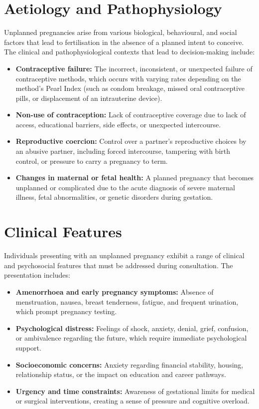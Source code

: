 \section*{Aetiology and Pathophysiology}
Unplanned pregnancies arise from various biological, behavioural, and social factors that lead to fertilisation in the absence of a planned intent to conceive. The clinical and pathophysiological contexts that lead to decision-making include:
\begin{itemize}
    \item \textbf{Contraceptive failure:} The incorrect, inconsistent, or unexpected failure of contraceptive methods, which occurs with varying rates depending on the method's Pearl Index (such as condom breakage, missed oral contraceptive pills, or displacement of an intrauterine device).
    \item \textbf{Non-use of contraception:} Lack of contraceptive coverage due to lack of access, educational barriers, side effects, or unexpected intercourse.
    \item \textbf{Reproductive coercion:} Control over a partner's reproductive choices by an abusive partner, including forced intercourse, tampering with birth control, or pressure to carry a pregnancy to term.
    \item \textbf{Changes in maternal or fetal health:} A planned pregnancy that becomes unplanned or complicated due to the acute diagnosis of severe maternal illness, fetal abnormalities, or genetic disorders during gestation.
\end{itemize}

\section*{Clinical Features}
Individuals presenting with an unplanned pregnancy exhibit a range of clinical and psychosocial features that must be addressed during consultation. The presentation includes:
\begin{itemize}
    \item \textbf{Amenorrhoea and early pregnancy symptoms:} Absence of menstruation, nausea, breast tenderness, fatigue, and frequent urination, which prompt pregnancy testing.
    \item \textbf{Psychological distress:} Feelings of shock, anxiety, denial, grief, confusion, or ambivalence regarding the future, which require immediate psychological support.
    \item \textbf{Socioeconomic concerns:} Anxiety regarding financial stability, housing, relationship status, or the impact on education and career pathways.
    \item \textbf{Urgency and time constraints:} Awareness of gestational limits for medical or surgical interventions, creating a sense of pressure and cognitive overload.
\end{itemize}

